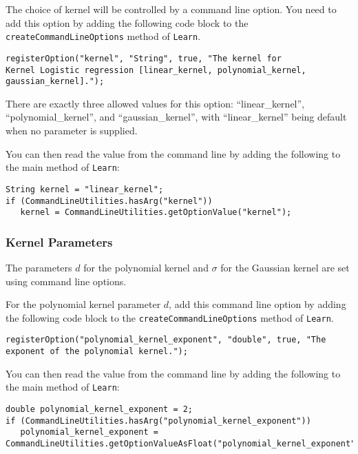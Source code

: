 \documentclass[11pt]{article}
\newcommand{\code}[1]{{\footnotesize \tt #1}}
\begin{document}
The choice of kernel will be controlled by a command line option.
You need to add this option by adding the following code block to the \code{createCommandLineOptions} method of \code{Learn}.

\begin{footnotesize}
\begin{verbatim}
registerOption("kernel", "String", true, "The kernel for
Kernel Logistic regression [linear_kernel, polynomial_kernel, gaussian_kernel].");
\end{verbatim}
\end{footnotesize}
There are exactly three allowed values for this option:
``linear\_kernel'', ``polynomial\_kernel'', and ``gaussian\_kernel'',
with ``linear\_kernel'' being default when no parameter is supplied.

You can then read the value from the command line by adding the following to the main method of \code{Learn}:
\begin{footnotesize}
\begin{verbatim}
String kernel = "linear_kernel";
if (CommandLineUtilities.hasArg("kernel"))
   kernel = CommandLineUtilities.getOptionValue("kernel");
\end{verbatim}
\end{footnotesize}

\subsubsection{Kernel Parameters}
\label{sec:kernel_parameters}

The parameters $d$ for the polynomial kernel and $\sigma$ for the Gaussian kernel are set using command line options.

For the polynomial kernel parameter $d$, add this command line option by adding the following code block to the \code{createCommandLineOptions} method of \code{Learn}.

\begin{footnotesize}
\begin{verbatim}
registerOption("polynomial_kernel_exponent", "double", true, "The exponent of the polynomial kernel.");
\end{verbatim}
\end{footnotesize}

You can then read the value from the command line by adding the following to the main method of \code{Learn}:
\begin{footnotesize}
\begin{verbatim}
double polynomial_kernel_exponent = 2;
if (CommandLineUtilities.hasArg("polynomial_kernel_exponent"))
   polynomial_kernel_exponent = CommandLineUtilities.getOptionValueAsFloat("polynomial_kernel_exponent");
\end{verbatim}
\end{footnotesize}
\end{document}
